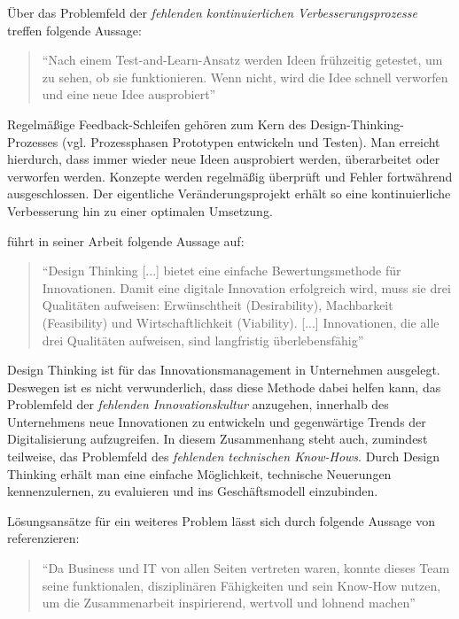 Über das Problemfeld der \textit{fehlenden kontinuierlichen Verbesserungsprozesse} treffen  folgende Aussage:

\begin{quote}
	``Nach einem Test-and-Learn-Ansatz werden Ideen frühzeitig getestet, um zu sehen, ob sie funktionieren. Wenn nicht, wird die Idee schnell verworfen und eine neue Idee ausprobiert'' \cite[S. 369]{urbach_digitalization_2018}
\end{quote}

Regelmäßige Feedback-Schleifen gehören zum Kern des Design-Thinking-Prozesses (vgl. Prozessphasen Prototypen entwickeln und Testen). Man erreicht hierdurch, dass immer wieder neue Ideen ausprobiert werden, überarbeitet oder verworfen werden. Konzepte werden regelmäßig überprüft und Fehler fortwährend ausgeschlossen. Der eigentliche Veränderungsprojekt erhält so eine kontinuierliche Verbesserung hin zu einer optimalen Umsetzung.

 führt in seiner Arbeit folgende Aussage auf:

\begin{quote}
	``Design Thinking [...] bietet eine einfache Bewertungsmethode für Innovationen. Damit eine digitale Innovation erfolgreich wird, muss sie drei Qualitäten aufweisen: Erwünschtheit (Desirability), Machbarkeit (Feasibility) und Wirtschaftlichkeit (Viability). [...] Innovationen, die alle drei Qualitäten aufweisen, sind langfristig überlebensfähig'' \cite[S. 207f.]{weinreich_lean_2016}
\end{quote}

Design Thinking ist für das Innovationsmanagement in Unternehmen ausgelegt. Deswegen ist es nicht verwunderlich, dass diese Methode dabei helfen kann, das Problemfeld der \textit{fehlenden Innovationskultur} anzugehen, innerhalb des Unternehmens neue Innovationen zu entwickeln und gegenwärtige Trends der Digitalisierung aufzugreifen. In diesem Zusammenhang steht auch, zumindest teilweise, das Problemfeld des \textit{fehlenden technischen Know-Hows}. Durch Design Thinking erhält man eine einfache Möglichkeit, technische Neuerungen kennenzulernen, zu evaluieren und ins Geschäftsmodell einzubinden.

Lösungsansätze für ein weiteres Problem lässt sich durch folgende Aussage von  referenzieren:

\begin{quote}
	``Da Business und IT von allen Seiten vertreten waren, konnte dieses Team seine funktionalen, disziplinären Fähigkeiten und sein Know-How nutzen, um die Zusammenarbeit inspirierend, wertvoll und lohnend machen'' \cite[S. 215]{oswald_shaping_2017}
\end{quote}


